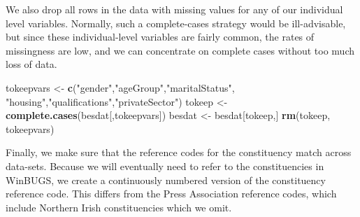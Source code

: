 \documentclass[12pt,twoside]{article}
\newenvironment{Shaded}{}{}
\newcommand{\KeywordTok}[1]{\textcolor[rgb]{0.00,0.44,0.13}{\textbf{{#1}}}}
\newcommand{\DataTypeTok}[1]{\textcolor[rgb]{0.56,0.13,0.00}{{#1}}}
\newcommand{\StringTok}[1]{\textcolor[rgb]{0.25,0.44,0.63}{{#1}}}
\newcommand{\CommentTok}[1]{\textcolor[rgb]{0.38,0.63,0.69}{\textit{{#1}}}}
\newcommand{\NormalTok}[1]{{#1}}
\begin{document}
We also drop all rows in the data with missing values for any of our
individual level variables. Normally, such a complete-cases strategy
would be ill-advisable, but since these individual-level variables are
fairly common, the rates of missingness are low, and we can concentrate
on complete cases without too much loss of data.

\begin{Shaded}
\begin{Highlighting}[]
\NormalTok{tokeepvars <-}\StringTok{ }\KeywordTok{c}\NormalTok{(}\StringTok{"gender"}\NormalTok{,}\StringTok{"ageGroup"}\NormalTok{,}\StringTok{"maritalStatus"}\NormalTok{,}
    \StringTok{"housing"}\NormalTok{,}\StringTok{"qualifications"}\NormalTok{,}\StringTok{"privateSector"}\NormalTok{)}
\NormalTok{tokeep <-}\StringTok{ }\KeywordTok{complete.cases}\NormalTok{(besdat[,tokeepvars])}
\NormalTok{besdat <-}\StringTok{ }\NormalTok{besdat[tokeep,]}
\KeywordTok{rm}\NormalTok{(tokeep, tokeepvars)}
\end{Highlighting}
\end{Shaded}

Finally, we make sure that the reference codes for the constituency
match across data-sets. Because we will eventually need to refer to the
constituencies in WinBUGS, we create a continuously numbered version of
the constituency reference code. This differs from the Press Association
reference codes, which include Northern Irish constituencies which we
omit.

\begin{Shaded}
\end{Shaded}
\end{document}
